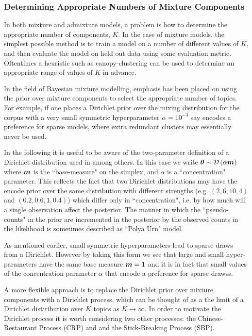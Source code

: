 

\subsubsection{Determining Appropriate Numbers of Mixture Components}
\label{sec:DPs}
In both mixture and admixture models, a problem is how to determine the appropriate number of components, $K$. In the case of mixture models, the simplest possible method is to train a model on a number of different values of $K$, and then evaluate the model on held out data using some evaluation metric. Oftentimes a heuristic such as canopy-clustering\cite{McCallum2000} can be used to determine an appropriate range of values of $K$ in advance.

In the field of Bayesian mixture modelling, emphasis has been placed on using the prior over mixture components to select the appropriate number of topics. For example, if one places a Dirichlet prior over the mixing distribution for the corpus with a very small symmetric hyperparameter $\alpha = 10^{-3}$ say encodes a preference for sparse models, where extra redundant clusters may essentially never be used. 

In the following it is useful to be aware of the two-parameter definition of a Dirichlet distribution used in \cite{MacKay1995}\cite{Wallach2006}\cite{Wallach2009a} among others. In this case we write $\bm \theta \sim \mathcal{D} \left( {\alpha \bm m} \right)$ where $\bm m$ is the ``base-measure" on the simplex, and $\alpha$ is a ``concentration" parameter. This reflects the fact that two Dirichlet distributions may have the encode prior over the same distribution with different strengths (e.g. $(2, 6, 10, 4)$ and $(0.2, 0.6, 1, 0.4)$) which differ only in ``concentration", i.e. by how much will a single observation affect the posterior. The manner in which the ``pseudo-counts" in the prior are incremented in the posterior by the observed counts in the likelihood is sometimes described as ``Polya Urn" model.

As mentioned earlier, small symmetric hyperparameters lead to sparse draws from a Dirichlet. However by taking this form we see that large and small hyper-parameters have the same base measure $\bm m=\bm 1$ and it is in fact that small values of the concentration parameter $\alpha$ that encode a preference for sparse drawss.

A more flexible approach is to replace the Dirichlet prior over mixture components with a Dirichlet process, which can be thought of as a the limit of a Dirichlet distiribution over $K$ topics as $K \rightarrow \infty$. In order to motivate the Dirichlet process it is worth considering two other processes: the Chinese-Restaurant Process (CRP) and and the Stick-Breaking Process (SBP).

